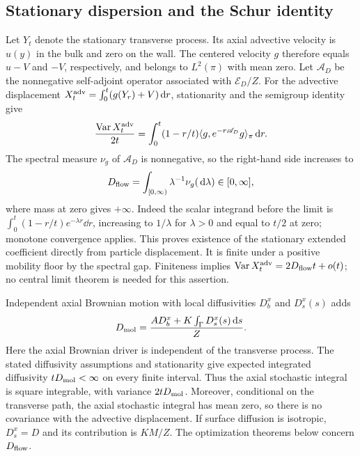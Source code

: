 \subsection{Stationary dispersion and the Schur identity}
\label{sec:schur}
Let $Y_t$ denote the stationary transverse process. Its axial advective
velocity is $u(y)$ in the bulk and zero on the wall. The centered
velocity $g$ therefore equals $u-V$ and $-V$, respectively, and belongs
to $L^2(\pi)$ with mean zero. Let $\mathscr A_D$ be the nonnegative
self-adjoint operator associated with $\mathcal E_D/Z$. For the
advective displacement $X_t^{\rm adv}=\int_0^t(g(Y_r)+V)\,\mathrm d r$,
stationarity and the semigroup identity give
\begin{equation}\label{eq:green-kubo-finite}
 \frac{\operatorname{Var} X_t^{\rm adv}}{2t}
 =\int_0^t(1-r/t)\langle g,e^{-r\mathscr A_D}g\rangle_\pi\,\mathrm d r.
\end{equation}
The spectral measure $\nu_g$ of $\mathscr A_D$ is nonnegative, so the
right-hand side increases to
\begin{equation}\label{eq:dispersion-spectral}
 D_{\mathrm{flow}}=\int_{[0,\infty)}\lambda^{-1}\nu_g(\,\mathrm d\lambda)
 \in[0,\infty],
\end{equation}
where mass at zero gives $+\infty$. Indeed the scalar integrand before
the limit is $\int_0^t(1-r/t)e^{-\lambda r}\dd r$, increasing to
$1/\lambda$ for $\lambda>0$ and equal to $t/2$ at zero; monotone
convergence applies. This proves existence of the stationary extended
coefficient directly from particle displacement. It is finite under a
positive mobility floor by the spectral gap. Finiteness implies
$\operatorname{Var} X_t^{\rm adv}=2D_{\mathrm{flow}} t+o(t)$; no central limit theorem is needed
for this assertion.

Independent axial Brownian motion with local diffusivities $D_b^x$ and
$D_s^x(s)$ adds
\begin{equation}\label{eq:molecular}
 D_{\rm mol}=\frac{A D_b^x+K\int_\Gamma D_s^x(s)\,\mathrm d s}{Z}.
\end{equation}
Here the axial Brownian driver is independent of the transverse process.
The stated diffusivity assumptions and stationarity give expected
integrated diffusivity $tD_{\rm mol}<\infty$ on every finite interval.
Thus the axial stochastic integral is square integrable, with variance
$2tD_{\rm mol}$. Moreover,
conditional on the transverse path, the axial stochastic integral has mean zero,
so there is no covariance with the advective displacement. If surface
diffusion is isotropic, $D_s^x=D$ and its contribution is $KM/Z$.
The optimization theorems below concern $D_{\mathrm{flow}}$.

